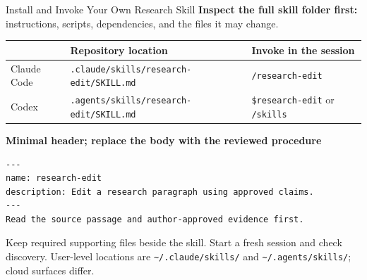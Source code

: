\begin{frame}[fragile]{Install and Invoke Your Own Research Skill}
\small
\textbf{Inspect the full skill folder first:} instructions, scripts, dependencies, and the files it may change.
\par\vspace{0.25cm}
\begin{tabular}{>{\raggedright\arraybackslash}p{2.3cm}>{\raggedright\arraybackslash}p{6.9cm}>{\raggedright\arraybackslash}p{3.3cm}}
\toprule
& \textbf{Repository location} & \textbf{Invoke in the session} \\
\midrule
Claude Code & \texttt{.claude/skills/research-edit/SKILL.md} & \texttt{/research-edit} \\
Codex & \texttt{.agents/skills/research-edit/SKILL.md} & \texttt{\$research-edit} or \texttt{/skills} \\
\bottomrule
\end{tabular}
\par\vspace{0.25cm}
\textbf{Minimal header; replace the body with the reviewed procedure}
\begin{verbatim}
---
name: research-edit
description: Edit a research paragraph using approved claims.
---
Read the source passage and author-approved evidence first.
\end{verbatim}
\small Keep required supporting files beside the skill. Start a fresh session and check discovery. User-level locations are \texttt{\textasciitilde/.claude/skills/} and \texttt{\textasciitilde/.agents/skills/}; cloud surfaces differ.
\par\vfill
{}
\end{frame}

